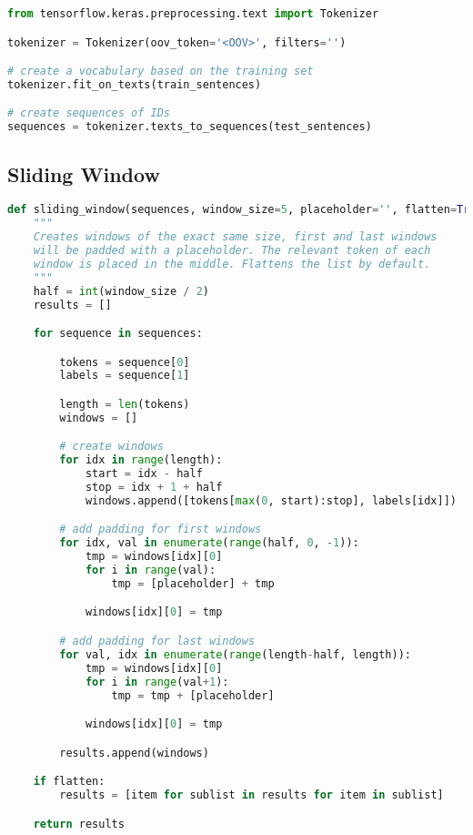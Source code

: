 \begin{lstlisting}[language=Python, label={code:keras-tokenizer}, caption=Fitting the Keras tokenizer]
from tensorflow.keras.preprocessing.text import Tokenizer

tokenizer = Tokenizer(oov_token='<OOV>', filters='')

# create a vocabulary based on the training set
tokenizer.fit_on_texts(train_sentences)

# create sequences of IDs
sequences = tokenizer.texts_to_sequences(test_sentences)
\end{lstlisting}

\subsection{Sliding Window}

\begin{lstlisting}[language=Python, label={code:sliding-window}, caption=Sliding window implementation]
def sliding_window(sequences, window_size=5, placeholder='', flatten=True):
    """
    Creates windows of the exact same size, first and last windows
    will be padded with a placeholder. The relevant token of each
    window is placed in the middle. Flattens the list by default.
    """
    half = int(window_size / 2)
    results = []

    for sequence in sequences:

        tokens = sequence[0]
        labels = sequence[1]

        length = len(tokens)
        windows = []

        # create windows
        for idx in range(length):
            start = idx - half
            stop = idx + 1 + half
            windows.append([tokens[max(0, start):stop], labels[idx]])

        # add padding for first windows
        for idx, val in enumerate(range(half, 0, -1)):
            tmp = windows[idx][0]
            for i in range(val):
                tmp = [placeholder] + tmp

            windows[idx][0] = tmp

        # add padding for last windows
        for val, idx in enumerate(range(length-half, length)):
            tmp = windows[idx][0]
            for i in range(val+1):
                tmp = tmp + [placeholder]

            windows[idx][0] = tmp

        results.append(windows)

    if flatten:
        results = [item for sublist in results for item in sublist]

    return results
\end{lstlisting}

